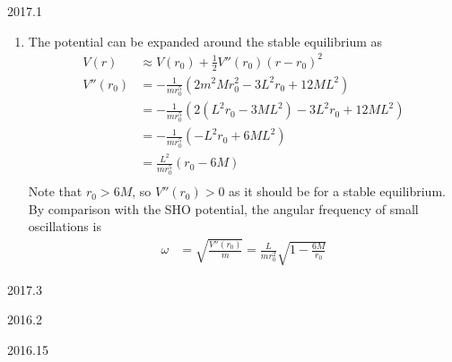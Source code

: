 \documentclass[12pt]{article}
\begin{document}
\begin{solution}{2017.1}
\begin{enumerate}
    \item
    The potential can be expanded around the stable equilibrium as
    \begin{align*}
      V(r) & \approx V(r_0) + \frac{1}{2} V''(r_0) (r-r_0)^2 \\
      V''(r_0) & = -\frac{1}{mr_0^5} \left( 2m^2 M r_0^2 - 3L^2 r_0 + 12ML^2 \right) \\
      & = -\frac{1}{mr_0^5} \left( 2(L^2 r_0 - 3ML^2) - 3L^2 r_0 + 12ML^2 \right) \\
      & = -\frac{1}{mr_0^5} \left( -L^2 r_0 + 6ML^2 \right) \\
      & = \frac{L^2}{mr_0^5} \left( r_0 - 6M \right) \\
    \end{align*}
    Note that $r_0 > 6M$, so $V''(r_0) > 0$ as it should be for a stable equilibrium.
    By comparison with the SHO potential, the angular frequency of small oscillations is
    \begin{align*}
      \omega & = \sqrt{\frac{V''(r_0)}{m}} = \frac{L}{mr_0^2} \sqrt{1 - \frac{6M}{r_0}}
    \end{align*}
  \end{enumerate}
\end{solution}


\begin{solution}{2017.3}

\end{solution}


\begin{solution}{2016.2}


\end{solution}


\begin{solution}{2016.15}

\end{solution}
\end{document}
